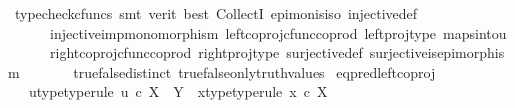 \begin{isabellebody}
\endisadelimproof
%
\isatagproof
{}\isamarkupfalse%
\ {\isacharparenleft}{\kern0pt}typecheck{\isacharunderscore}{\kern0pt}cfuncs{\isacharcomma}{\kern0pt}\ smt\ {\isacharparenleft}{\kern0pt}verit{\isacharcomma}{\kern0pt}\ best{\isacharparenright}{\kern0pt}\ CollectI\ epi{\isacharunderscore}{\kern0pt}mon{\isacharunderscore}{\kern0pt}is{\isacharunderscore}{\kern0pt}iso\ injective{\isacharunderscore}{\kern0pt}def{}\isanewline
\ \ \ \ \ \ injective{\isacharunderscore}{\kern0pt}imp{\isacharunderscore}{\kern0pt}monomorphism\ left{\isacharunderscore}{\kern0pt}coproj{\isacharunderscore}{\kern0pt}cfunc{\isacharunderscore}{\kern0pt}coprod\ left{\isacharunderscore}{\kern0pt}proj{\isacharunderscore}{\kern0pt}type\ maps{\isacharunderscore}{\kern0pt}into{\isacharunderscore}{\kern0pt}{}u{}\isanewline
\ \ \ \ \ \ right{\isacharunderscore}{\kern0pt}coproj{\isacharunderscore}{\kern0pt}cfunc{\isacharunderscore}{\kern0pt}coprod\ right{\isacharunderscore}{\kern0pt}proj{\isacharunderscore}{\kern0pt}type\ surjective{\isacharunderscore}{\kern0pt}def{}\ surjective{\isacharunderscore}{\kern0pt}is{\isacharunderscore}{\kern0pt}epimorphism\ \isanewline
\ \ \ \ \ \ true{\isacharunderscore}{\kern0pt}false{\isacharunderscore}{\kern0pt}distinct\ true{\isacharunderscore}{\kern0pt}false{\isacharunderscore}{\kern0pt}only{\isacharunderscore}{\kern0pt}truth{\isacharunderscore}{\kern0pt}values{\isacharparenright}{\kern0pt}%
\endisatagproof
{\isafoldproof}%
%
\isadelimproof
%
\endisadelimproof
%
\isadelimdocument
%
\endisadelimdocument
%
\isatagdocument
%
\isamarkuptrue%
%
\endisatagdocument
{\isafolddocument}%
%
\isadelimdocument
%
\endisadelimdocument
{}\isamarkupfalse%
\ eq{\isacharunderscore}{\kern0pt}pred{\isacharunderscore}{\kern0pt}left{\isacharunderscore}{\kern0pt}coproj{\isacharcolon}{\kern0pt}\isanewline
\ \ \ u{\isacharunderscore}{\kern0pt}type{\isacharbrackleft}{\kern0pt}type{\isacharunderscore}{\kern0pt}rule{\isacharbrackright}{\kern0pt}{\isacharcolon}{\kern0pt}\ {\isachardoublequoteopen}u\ {\isasymin}\isactrlsub c\ X\ {\isasymCoprod}\ Y{\isachardoublequoteclose}\ \ x{\isacharunderscore}{\kern0pt}type{\isacharbrackleft}{\kern0pt}type{\isacharunderscore}{\kern0pt}rule{\isacharbrackright}{\kern0pt}{\isacharcolon}{\kern0pt}\ {\isachardoublequoteopen}x\ {\isasymin}\isactrlsub c\ X{\isachardoublequoteclose}\isanewline

\end{isabellebody}
